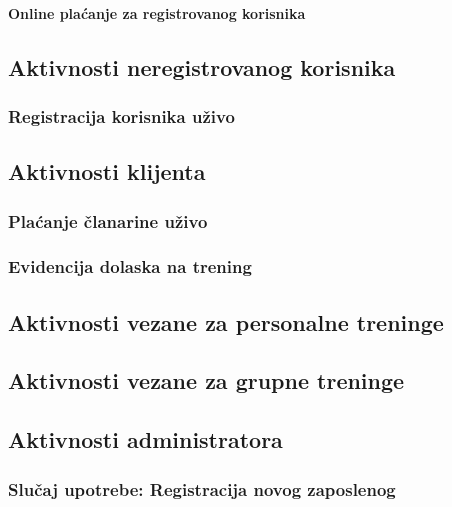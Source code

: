 \documentclass[a4paper]{article}
\begin{document}
\paragraph{Online plaćanje za registrovanog korisnika}


\subsection{Aktivnosti neregistrovanog korisnika}
\subsubsection{Registracija korisnika uživo}


\subsection{Aktivnosti klijenta}
\subsubsection{Plaćanje članarine uživo}


\subsubsection{Evidencija dolaska na trening}


\newpage
\subsection{Aktivnosti vezane za personalne treninge}


\newpage
\subsection{Aktivnosti vezane za grupne treninge}

\newpage
\subsection{Aktivnosti administratora}
\subsubsection{Slučaj upotrebe: Registracija novog zaposlenog}

\end{document}
